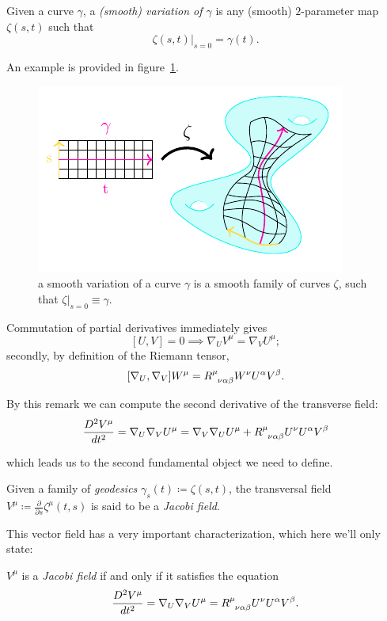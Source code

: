 \begin{definition}
	Given a curve \(\gamma\), a \emph{(smooth) variation of \(\gamma\)} is any (smooth) \(2\)-parameter map \(\zeta(s,t)\) such that 
	\[
	\left. \zeta(s, t) \right\vert_{s = 0} = \gamma(t).
	\]
\end{definition}
An example is provided in figure~\ref{fig:family-curves}.
\begin{figure}
	\caption[]{a smooth variation of a curve \(\gamma\) is a smooth family of curves \(\zeta\), such that \(\zeta\vert_{s = 0} \equiv \gamma\).}
	\label{fig:family-curves}
	\centering
	\includegraphics[scale=2.2]{Immagini/family-geodesics/family-geodesics.pdf}
\end{figure}

\begin{remark}
	Commutation of partial derivatives immediately gives 
	\[
	[U, V] = 0 \implies \nabla_U V^{\mu} = \nabla_V U^{\mu};
	\]
	secondly, by definition of the Riemann tensor,
	\[
	[\nabla_U, \nabla_V]W^{\mu} = R\indices{^{\mu}_{\nu\alpha\beta}}W^{\nu}U^{\alpha}V^{\beta}.
	\]
\end{remark}

By this remark we can compute the second derivative of the transverse field:
\[
\frac{D^2\tensor{V}{^\mu} }{dt^2} = \nabla_U\nabla_V U^{\mu} = \nabla_V\nabla_U U^{\mu} + R\indices{^{\mu}_{\nu\alpha\beta}}U^{\nu}U^{\alpha}V^{\beta}
\]

which leads us to the second fundamental object we need to define. 
\begin{definition}
	Given a family of \emph{geodesics} \(\gamma_s(t) \coloneqq \zeta(s,t)\), the transversal field \(V^{\mu} \coloneqq \frac{\partial}{\partial s} \zeta^{\mu}(t,s)\) is said to be a \emph{Jacobi field}.
\end{definition}

This vector field has a very important characterization, which here we'll only state:
\begin{lemma}
\(V^{\mu}\) is a \emph{Jacobi field} if and only if it satisfies the equation
	\begin{equation}
	\label{eq:Jacobi}
		\frac{D^2\tensor{V}{^\mu} }{dt^2} = \nabla_U\nabla_V U^{\mu} =  R\indices{^{\mu}_{\nu\alpha\beta}}U^{\nu}U^{\alpha}V^{\beta}.
	\end{equation}
\end{lemma}

